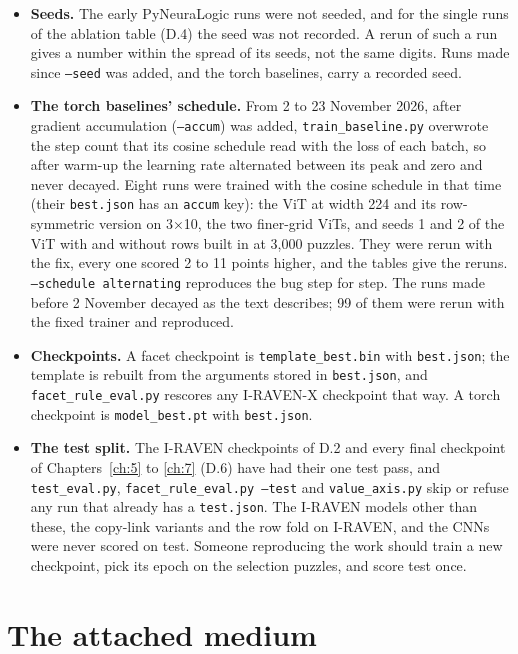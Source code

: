 \begin{itemize}
\item \textbf{Seeds.} The early PyNeuraLogic runs were not seeded, and for the single runs of the ablation table (D.4) the seed was not recorded. A rerun of such a run gives a number within the spread of its seeds, not the same digits. Runs made since \texttt{--seed} was added, and the torch baselines, carry a recorded seed.
\item \textbf{The torch baselines' schedule.} From 2 to 23 November 2026, after gradient accumulation (\texttt{--accum}) was added, \texttt{train\_baseline.py} overwrote the step count that its cosine schedule read with the loss of each batch, so after warm-up the learning rate alternated between its peak and zero and never decayed. Eight runs were trained with the cosine schedule in that time (their \texttt{best.json} has an \texttt{accum} key): the ViT at width 224 and its row-symmetric version on 3×10, the two finer-grid ViTs, and seeds 1 and 2 of the ViT with and without rows built in at 3,000 puzzles. They were rerun with the fix, every one scored 2 to 11 points higher, and the tables give the reruns. \texttt{--schedule alternating} reproduces the bug step for step. The runs made before 2 November decayed as the text describes; 99 of them were rerun with the fixed trainer and reproduced.
\item \textbf{Checkpoints.} A facet checkpoint is \texttt{template\_best.bin} with \texttt{best.json}; the template is rebuilt from the arguments stored in \texttt{best.json}, and \texttt{facet\_rule\_eval.py} rescores any I-RAVEN-X checkpoint that way. A torch checkpoint is \texttt{model\_best.pt} with \texttt{best.json}.
\item \textbf{The test split.} The I-RAVEN checkpoints of D.2 and every final checkpoint of Chapters~\ref{ch:5} to \ref{ch:7} (D.6) have had their one test pass, and \texttt{test\_eval.py}, \texttt{facet\_rule\_eval.py --test} and \texttt{value\_axis.py} skip or refuse any run that already has a \texttt{test.json}. The I-RAVEN models other than these, the copy-link variants and the row fold on I-RAVEN, and the CNNs were never scored on test. Someone reproducing the work should train a new checkpoint, pick its epoch on the selection puzzles, and score test once.
\end{itemize}

\section{The attached medium}\label{sec:F.4}

